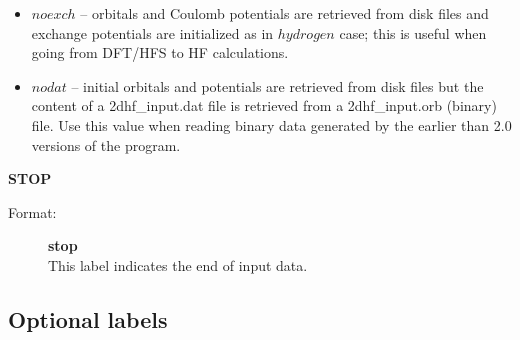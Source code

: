 \documentclass[12pt,a4paper]{article}
\begin{document}
\begin{description}
\begin{description}
\begin{itemize}
\item $noexch$ -- orbitals and Coulomb potentials are retrieved from disk files and
  exchange potentials are initialized as in $hydrogen$ case; this is useful when going
  from DFT/HFS to HF calculations.

\item $nodat$ -- initial orbitals and potentials are retrieved from disk files but the
  content of a 2dhf\_input.dat file is retrieved from a 2dhf\_input.orb (binary) file. Use
  this value when reading binary data generated by the earlier than 2.0 versions of the
  program.

\end{itemize}
\end{description}



\item \textbf{STOP}
\begin{description}
\item[Format:] \textbf{stop}\\
This label indicates the end of input data.
\end{description}

\end{description}


\subsection{Optional labels}
\end{document}
